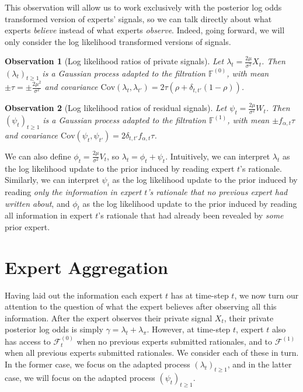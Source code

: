\documentclass{winnower}
\newtheorem{observation}{Observation}
\begin{document}
This observation will allow us to work exclusively with the posterior log odds transformed version of experts' signals, so we can talk directly about what experts \emph{believe} instead of what experts \emph{observe}. Indeed, going forward, we will only consider the log likelihood transformed versions of signals.

\begin{observation}[Log likelihood ratios of private signals]\label{obs:llpriv}
    Let $\lambda_t = \frac{2\mu}{\sigma^2} X_t$. Then $\left(\lambda_t\right)_{t\geq 1}$ is a Gaussian process adapted to the filtration $\mathbb{F}^{(0)}$, with mean $\pm \tau = \pm \frac{2\mu^2}{\sigma^2}$ and covariance $\text{Cov}(\lambda_t, \lambda_{t'}) = 2\tau (\rho + \delta_{t, t'}(1-\rho))$.
\end{observation}

\begin{observation}[Log likelihood ratios of residual signals]\label{obs:llresi}  
    Let $\psi_t = \frac{2\mu}{\sigma^2}W_t$. Then $\left(\psi_t\right)_{t \geq 1}$ is a Gaussian process adapted to the filtration $\mathbb{F}^{(1)}$, with mean $\pm f_{\alpha, t}\tau$ and covariance $\text{Cov}(\psi_t, \psi_{t'}) = 2\delta_{t,t'}f_{\alpha, t} \tau$.
\end{observation}

We can also define $\phi_t = \frac{2\mu}{\sigma^2}V_t$, so $\lambda_t = \phi_t + \psi_t$. Intuitively, we can interpret $\lambda_t$ as the log likelihood update to the prior induced by reading expert $t$'s rationale. Similarly, we can interpret $\psi_i$ as the log likelihood update to the prior induced by reading \emph{only the information in expert $t$'s rationale that no previous expert had written about}, and $\phi_t$ as the log likelihood update to the prior induced by reading all information in expert $t$'s rationale that had already been revealed by \emph{some} prior expert.

\section{Expert Aggregation} \label{sec:agg}

Having laid out the information each expert $t$ has at time-step $t$, we now turn our attention to the question of what the expert believes after observing all this information. After the expert observes their private signal $X_t$, their private posterior log odds is simply $\gamma = \lambda_t + \lambda_\pi$. However, at time-step $t$, expert $t$ also has access to $\mathcal{F}_t^{(0)}$ when no previous experts submitted rationales, and to $\mathcal{F}^{(1)}$ when all previous experts submitted rationales. We consider each of these in turn. In the former case, we focus on the adapted process $(\lambda_t)_{t\geq 1}$, and in the latter case, we will focus on the adapted process $(\psi_t)_{t\geq 1}$.
\end{document}

